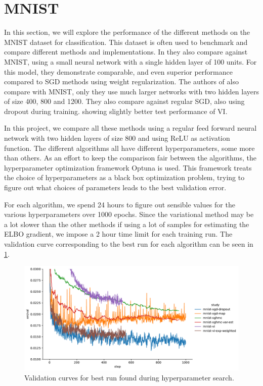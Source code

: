 \section{MNIST}
In this section, we will explore the performance of the different methods on the MNIST dataset for classification. 
This dataset is often used to benchmark and compare different methods and implementations. 
In \cite{chen_stochastic_2014} they also compare against MNIST, using a small neural network with a single hidden layer of 100 units.
For this model, they demonstrate comparable, and even superior performance compared to SGD methods using weight regularization.
The authors of \cite{blundell_weight_2015} also compare with MNIST, only they use much larger networks with two hidden layers of size 400, 800 and 1200. 
They also compare against regular SGD, also using dropout during training. showing slightly better test performance of VI.

In this project, we compare all these methods using a regular feed forward neural network with two hidden layers of size 800 and using ReLU as activation function. 
The different algorithms all have different hyperparameters, some more than others.
As an effort to keep the comparison fair between the algorithms, the hyperparameter optimization framework Optuna \cite{akiba_optuna_2019} is used. 
This framework treats the choice of hyperparameters as a black box optimization problem, trying to figure out what choices of parameters leads to the best validation error.

For each algorithm, we spend 24 hours to figure out sensible values for the various hyperparameters over 1000 epochs. 
Since the variational method may be a lot slower than the other methods if using a lot of samples for estimating the ELBO gradient, we impose a 2 hour time limit for each training run. 
The validation curve corresponding to the best run for each algorithm can be seen in \cref{fig:mnist-best-val-curves}.
\begin{figure}[htbp]
    \centering
    \includegraphics[width=.9\linewidth]{Figures/mnist-best-runs-val-curves.pdf}
    \caption{Validation curves for best run found during hyperparameter search.}
    \label{fig:mnist-best-val-curves}
\end{figure}

